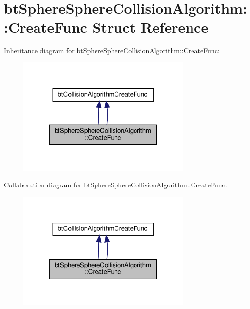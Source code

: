 \hypertarget{structbtSphereSphereCollisionAlgorithm_1_1CreateFunc}{}\section{bt\+Sphere\+Sphere\+Collision\+Algorithm\+:\+:Create\+Func Struct Reference}
\label{structbtSphereSphereCollisionAlgorithm_1_1CreateFunc}


Inheritance diagram for bt\+Sphere\+Sphere\+Collision\+Algorithm\+:\+:Create\+Func\+:
\nopagebreak
\begin{figure}[H]
\begin{center}
\leavevmode
\includegraphics[width=245pt]{structbtSphereSphereCollisionAlgorithm_1_1CreateFunc__inherit__graph}
\end{center}
\end{figure}


Collaboration diagram for bt\+Sphere\+Sphere\+Collision\+Algorithm\+:\+:Create\+Func\+:
\nopagebreak
\begin{figure}[H]
\begin{center}
\leavevmode
\includegraphics[width=245pt]{structbtSphereSphereCollisionAlgorithm_1_1CreateFunc__coll__graph}
\end{center}
\end{figure}
